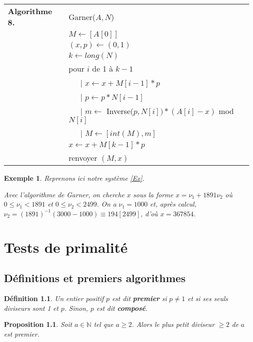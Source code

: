 \documentclass[10pt,a4paper]{report}
\newtheorem*{de}{Définition}
\newtheorem*{ex}{Exemple}
\newtheorem{Prop}[thm]{Proposition}
\begin{document}
\begin{tabular}{ll}
\textbf{Algorithme 8.} & Garner($A,N$)\\
           & $M \leftarrow  [A[0]]$ \\
           & $(x,p)\leftarrow (0,1) $ \\
           & $ k \leftarrow long(N) $    \\
           & pour $i$ de 1 à $k-1$ \\
           & \ \ \ {\rm | } $ x \leftarrow x+M[i-1]*p $  \\
           & \ \ \ {\rm | } $p \leftarrow p*N[i-1] $ \\
           & \ \ \ {\rm | } $ m \leftarrow $ Inverse($p,N[i])*(A[i]-x) $ mod $N[i]$\\ 
           & \ \ \ {\rm | } $M \leftarrow  [int(M),m ] $  \\
           & $x \leftarrow x + M[k-1]*p$ \\    
           &  renvoyer $(M,x)$ 
\end{tabular}

\begin{ex}
Reprenons ici notre système \eqref{Ex}. \par 
Avec l'algorithme de Garner, on cherche $x$ sous la forme $x=\nu_1 +1891 \nu_2 $ où $0 \leqslant \nu_1 < 1891$ et $0 \leqslant \nu_2 < 2499$. On a $\nu_1=1000$ et, après calcul, $\nu_2=(1891)^{-1}(3000-1000)\equiv 194 [2499]$, d'où $x=367854$.
\end{ex}

\chapter{Tests de primalité}


\section{Définitions et premiers algorithmes}

\begin{de}
Un entier positif $p$ est dit \textbf{premier} si $p \neq 1$ et si ses seuls diviseurs sont 1 et $p$. Sinon, $p$ est dit \textbf{composé}.
\end{de}

\begin{Prop}\label{p41}
Soit $a \in \mathbb{N}$ tel que $a \geqslant 2$. Alors le plus petit diviseur $\geqslant 2$ de $a$ est premier. 
\end{Prop}
\end{document}
